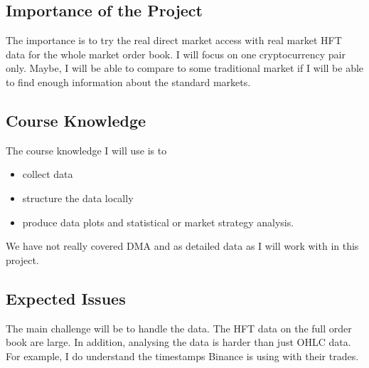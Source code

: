 \documentclass[12pt]{article}
\begin{document}
\subsection{Importance of the Project}
The importance is to try the real direct market access with real market HFT data for the whole market order book. I will focus on one cryptocurrency pair only. Maybe, I will be able to compare to some traditional market if I will be able to find enough information about the standard markets.

\subsection{Course Knowledge}
The course knowledge I will use is to
\begin{itemize}
\item collect data
\item structure the data locally
\item produce data plots and statistical or market strategy analysis.
\end{itemize}
We have not really covered DMA and as detailed data as I will work with in this project.

\subsection{Expected Issues}
The main challenge will be to handle the data. The HFT data on the full order book are large. In addition, analysing the data is harder than just OHLC data. For example, I do understand the timestamps Binance is using with their trades.
\end{document}
